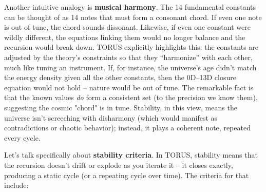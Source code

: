 Another intuitive analogy is \textbf{musical harmony}. The 14
fundamental constants can be thought of as 14 notes that must form a
consonant chord. If even one note is out of tune, the chord sounds
dissonant. Likewise, if even one constant were wildly different, the
equations linking them would no longer balance and the recursion would
break down. TORUS explicitly highlights this: the constants are adjusted
by the theory's constraints so that they ``harmonize'' with each other,
much like tuning an instrument​. If, for instance, the universe's age
didn't match the energy density given all the other constants, then the
0D--13D closure equation would not hold -- nature would be out of tune.
The remarkable fact is that the known values \emph{do} form a consistent
set (to the precision we know them), suggesting the cosmic "chord" is in
tune. Stability, in this view, means the universe isn't screeching with
disharmony (which would manifest as contradictions or chaotic behavior);
instead, it plays a coherent note, repeated every cycle.

Let's talk specifically about \textbf{stability criteria}. In TORUS,
stability means that the recursion doesn't drift or explode as you
iterate it -- it closes exactly, producing a static cycle (or a
repeating cycle over time). The criteria for that include:


